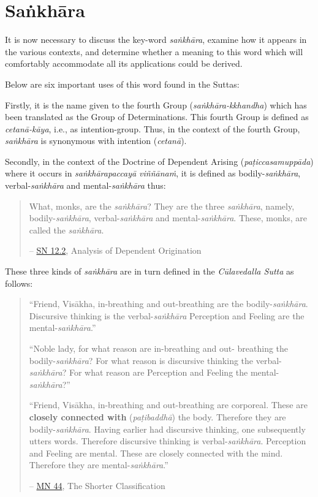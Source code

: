 \chapter{Saṅkhāra}

It is now necessary to discuss the key-word \emph{saṅkhāra}, examine how it appears in the various contexts, and determine whether a meaning to this word which will comfortably accommodate all its applications could be derived.

Below are six important uses of this word found in the Suttas:

Firstly, it is the name given to the fourth Group (\emph{saṅkhāra-kkhandha}) which has been translated as the Group of Determinations. This fourth Group is defined as \emph{cetanā-kāya}, i.e., as intention-group. Thus, in the context of the fourth Group, \emph{saṅkhāra} is synonymous with intention (\emph{cetanā}).

Secondly, in the context of the Doctrine of Dependent Arising (\emph{paṭiccasamuppāda}) where it occurs in \emph{saṅkhārapaccayā viññānaṁ}, it is defined as bodily-\emph{saṅkhāra}, verbal-\emph{saṅkhāra} and mental-\emph{saṅkhāra} thus:

\begin{quote}
What, monks, are the \emph{saṅkhāra}? They are the three \emph{saṅkhāra}, namely, bodily-\emph{saṅkhāra}, verbal-\emph{saṅkhāra} and mental-\emph{saṅkhāra}. These, monks, are called the \emph{saṅkhāra}.

 -- \href{https://suttacentral.net/sn12.2/en/bodhi}{SN 12.2}, Analysis of Dependent Origination
\end{quote}

These three kinds of \emph{saṅkhāra} are in turn defined in the \emph{Cūlavedalla Sutta} as follows:

\begin{quote}
``Friend, Visākha, in-breathing and out-breathing are the bodily-\emph{saṅkhāra}. Discursive thinking is the verbal-\emph{saṅkhāra} Perception and Feeling are the mental-\emph{saṅkhāra}.''

``Noble lady, for what reason are in-breathing and out- breathing the bodily-\emph{saṅkhāra}? For what reason is discursive thinking the verbal-\emph{saṅkhāra}? For what reason are Perception and Feeling the mental-\emph{saṅkhāra}?''

``Friend, Visākha, in-breathing and out-breathing are corporeal. These are \textbf{closely connected with} (\emph{paṭibaddhā}) the body. Therefore they are bodily-\emph{saṅkhāra}. Having earlier had discursive thinking, one subsequently utters words. Therefore discursive thinking is verbal-\emph{saṅkhāra}. Perception and Feeling are mental. These are closely connected with the mind. Therefore they are mental-\emph{saṅkhāra}.''

 -- \href{https://suttacentral.net/mn44/en/sujato}{MN 44}, The Shorter Classification
\end{quote}

